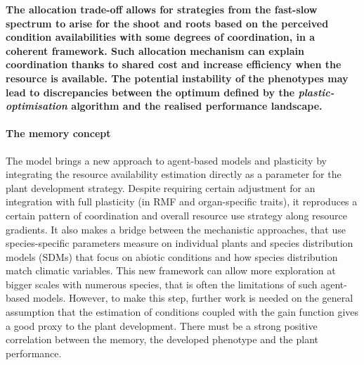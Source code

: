 

\textbf{The allocation trade-off allows for strategies from the fast-slow spectrum to arise for the shoot and roots based on the perceived condition availabilities with some degrees of coordination, in a coherent framework. Such allocation mechanism can explain coordination thanks to shared cost and increase efficiency when the resource is available. The potential instability of the phenotypes may lead to discrepancies between the optimum defined by the \textit{plastic-optimisation} algorithm and the realised performance landscape. }

\paragraph{The memory concept}

The model \model brings a new approach to agent-based models and plasticity by integrating the resource availability estimation directly as a parameter for the plant development strategy. Despite requiring certain adjustment for an integration with full plasticity (in RMF and organ-specific traits), it reproduces a certain pattern of coordination and overall resource use strategy along resource gradients. It also makes a bridge between the mechanistic approaches, that use species-specific parameters measure on individual plants and species distribution models (SDMs) that focus on abiotic conditions  and how species distribution match climatic variables. This new framework can allow more exploration at bigger scales with numerous species, that is often the limitations of such agent-based models. However, to make this step, further work is needed on the general assumption that the estimation of conditions coupled with the gain function gives a good proxy to the plant development. There must be a strong positive correlation between the memory, the developed phenotype and the plant performance. 

